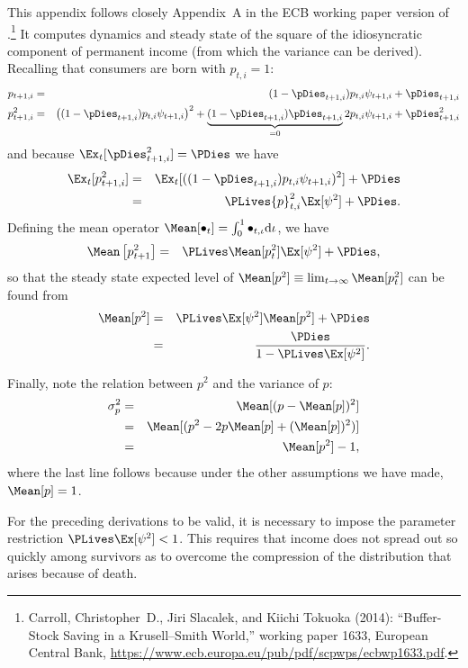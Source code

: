 

This appendix follows closely Appendix~A in the ECB working paper version of \cite{cstKS}.\footnote{Carroll, Christopher~D., Jiri Slacalek,  and Kiichi Tokuoka  (2014): ``Buffer-Stock Saving in a Krusell--Smith World,'' working paper 1633, European Central Bank, \url{https://www.ecb.europa.eu/pub/pdf/scpwps/ecbwp1633.pdf}.} It computes dynamics and steady state of the square of the idiosyncratic component
of permanent income (from which the variance can be derived).  Recalling that consumers are
born with $p_{t,i}=1$:
\begin{eqnarray}
    {p}_{t+1,i} & = & (1-\pDies_{t+1,i}) {p}_{t,i}\psi_{t+1,i} + \pDies_{t+1,i} \nonumber
\\  {p}_{t+1,i}^{2} & = & \big((1-\pDies_{t+1,i}) {p}_{t,i}\psi_{t+1,i}\big)^{2}+ \underbrace{(1-\pDies_{t+1,i})\pDies_{t+1,i}}_{= 0} 2 {p}_{t,i}\psi_{t+1,i} + \pDies_{t+1,i}^{2} \nonumber
\end{eqnarray}
and because  $\Ex_{t}[\pDies_{t+1,i}^{2}] = \PDies$ we have
\begin{eqnarray}
\Ex_{t}[{p}_{t+1,i}^{2}] & = &  \Ex_{t}[((1-\pDies_{t+1,i}) {p}_{t,i }\psi_{t+1,i})^{2}] + \PDies \nonumber
\\ & = & \PLives {p}_{t,i}^{2} \Ex[\psi^{2}] + \PDies. \nonumber
\end{eqnarray}
Defining the mean operator $\Mean[\bullet_{t}]=\int_{0}^{1} \bullet_{t,\iota} \text{d}\iota$, we have
\begin{eqnarray}
  \Mean\left[ {p}_{t+1}^{2} \right] & = & \PLives \Mean[{p}^{2}_{t}] \Ex[\psi^{2}] + \PDies, \nonumber
\end{eqnarray}
so that the steady state expected level of $\Mean[{p}^{2}] \equiv \lim_{t \rightarrow
  \infty} \Mean[{p}_{t}^{2}]$ can be found from
\begin{eqnarray}
  \Mean[{p}^{2}] & = &  \PLives \Ex[\psi^{2}] \Mean[{p}^{2}] + \PDies \nonumber
\\                          & = & \frac{\PDies}{1-\PLives \Ex[\psi^{2}]}. \nonumber
\end{eqnarray}

Finally, note the relation between $p^{2}$ and the variance of ${p}$:
\begin{eqnarray}
  \sigma^{2}_{p} & = & \Mean[({p}-\Mean[{p}])^{2}] \nonumber
\\ & = & \Mean[({p}^{2}-2 {p} \Mean[{p}]+(\Mean[{p}])^{2})] \nonumber
\\ & = & \Mean[{p}^{2}]-1, \nonumber
\end{eqnarray}
where the last line follows because under the other assumptions we
have made, $\Mean[{p}]=1$.

For the preceding derivations to be valid, it is necessary to
impose the parameter restriction $\PLives \Ex[\psi^{2}] < 1$.  This requires
that income does not spread out so quickly among survivors as to
overcome the compression of the distribution that arises because of death.

